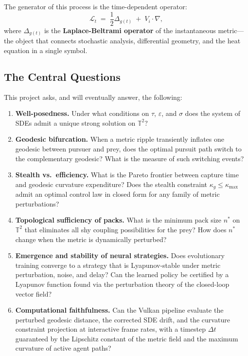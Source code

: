The generator of this process is the time-dependent operator:
\[
  \mathcal{L}_t \;=\; \frac{1}{2}\Delta_{g(t)} \;+\; V_i \cdot \nabla,
\]
where $\Delta_{g(t)}$ is the \textbf{Laplace-Beltrami operator} of the
instantaneous metric---the object that connects stochastic analysis,
differential geometry, and the heat equation in a single symbol.

\subsection*{The Central Questions}

This project asks, and will eventually answer, the following:

\begin{enumerate}
  \item \textbf{Well-posedness.} Under what conditions on $\tau$, $\varepsilon$,
    and $\sigma$ does the system of SDEs admit a unique strong solution on
    $\mathbb{T}^2$?

  \item \textbf{Geodesic bifurcation.} When a metric ripple transiently inflates
    one geodesic between pursuer and prey, does the optimal pursuit path switch
    to the complementary geodesic? What is the measure of such switching events?

  \item \textbf{Stealth vs.\ efficiency.} What is the Pareto frontier between
    capture time and geodesic curvature expenditure? Does the stealth constraint
    $\kappa_g \leq \kappa_{\max}$ admit an optimal control law in closed form
    for any family of metric perturbations?

  \item \textbf{Topological sufficiency of packs.} What is the minimum pack
    size $n^*$ on $\mathbb{T}^2$ that eliminates all shy coupling possibilities
    for the prey? How does $n^*$ change when the metric is dynamically
    perturbed?

  \item \textbf{Emergence and stability of neural strategies.} Does
    evolutionary training converge to a strategy that is Lyapunov-stable under
    metric perturbation, noise, and delay? Can the learned policy be certified
    by a Lyapunov function found via the perturbation theory of the
    closed-loop vector field?

  \item \textbf{Computational faithfulness.} Can the Vulkan pipeline evaluate
    the perturbed geodesic distance, the corrected SDE drift, and the curvature
    constraint projection at interactive frame rates, with a timestep $\Delta t$
    guaranteed by the Lipschitz constant of the metric field and the maximum
    curvature of active agent paths?
\end{enumerate}

